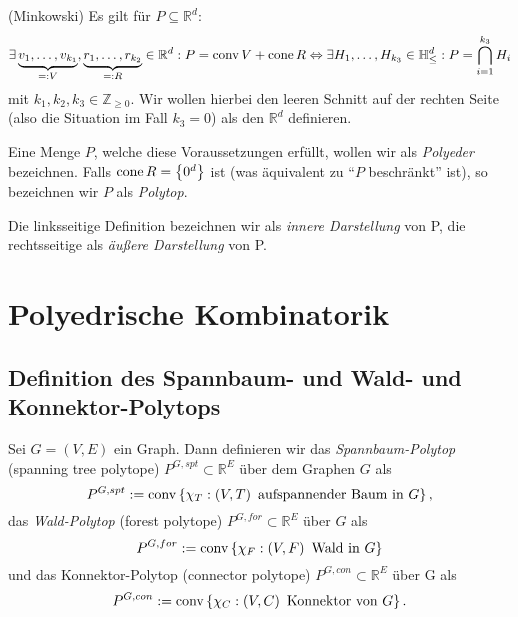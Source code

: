\documentclass[10p,a4paper,BCOR = 12mm, DIV=15]{scrbook}
\begin{document}
\begin{Sa} (Minkowski)
Es gilt für $P \subseteq \mathbb{R}^d$:
\begin{displaymath}
\exists \underbrace{v_1, \ldots, v_{k_1}}_{=: V}, \underbrace{r_1, \ldots, r_{k_2}}_{=: R} \in \mathbb{R}^d: P = \operatorname{conv} V + \operatorname{cone} R \Leftrightarrow \exists H_1, \ldots, H_{k_3} \in \mathbb{H}_{\leq}^d: P = \bigcap_{i=1}^{k_3} H_i
\end{displaymath}
mit $k_1, k_2, k_3 \in \mathbb{Z}_{\geq 0}$. Wir wollen hierbei den leeren Schnitt auf der rechten Seite (also die Situation im Fall $k_3 = 0$) als den $\mathbb{R}^d$ definieren.

Eine Menge $P$, welche diese Voraussetzungen erfüllt, wollen wir als \emph{Polyeder} bezeichnen. Falls $\operatorname{cone} R = \left\{0^d\right\}$ ist (was äquivalent zu "`$P$ beschränkt"' ist), so bezeichnen wir $P$ als \emph{Polytop}.

Die linksseitige Definition bezeichnen wir als \emph{innere Darstellung} von P, die rechtsseitige als \emph{äußere Darstellung} von P.
\end{Sa}

\chapter{Polyedrische Kombinatorik}

\section{Definition des Spannbaum- und Wald- und Konnektor-Polytops}

\begin{Def}
Sei $G=\left(V, E\right)$ ein Graph. Dann definieren wir das \emph{Spannbaum-Polytop} (spanning tree polytope) $P^{G, spt} \subset \mathbb{R}^E$ über dem Graphen $G$ als
\begin{displaymath}
P^{G, spt} := \operatorname{conv} \left\{\chi_T: \left(V, T\right) \textnormal{ aufspannender Baum in } G\right\},
\end{displaymath}
das \emph{Wald-Polytop} (forest polytope) $P^{G, for} \subset \mathbb{R}^E$ über $G$ als
\begin{displaymath}
P^{G, for} := \operatorname{conv} \left\{\chi_F: \left(V, F\right) \textnormal{ Wald in } G\right\}
\end{displaymath}
und das Konnektor-Polytop (connector polytope) $P^{G, con} \subset \mathbb{R}^E$ über G als
\begin{displaymath}
P^{G, con} := \operatorname{conv} \left\{\chi_C: \left(V, C\right) \textnormal{ Konnektor von } G\right\}.
\end{displaymath}
\end{Def}
\end{document}
